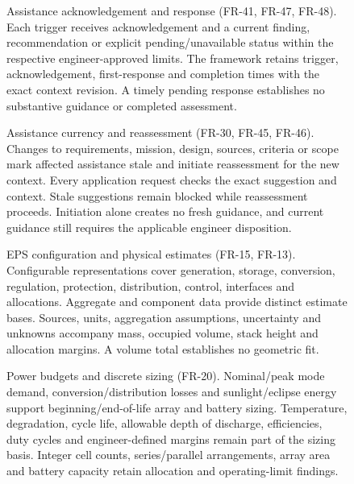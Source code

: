 \begin{figure}[H]
\centering
{}
\caption[Assistance acknowledgement and response.]{Assistance acknowledgement and response (FR-41, FR-47, FR-48). Each trigger receives acknowledgement and a current finding, recommendation or explicit pending/unavailable status within the respective engineer-approved limits. The framework retains trigger, acknowledgement, first-response and completion times with the exact context revision. A timely pending response establishes no substantive guidance or completed assessment.}
\label{fig:fr-flow-05}
\end{figure}
\clearpage

\begin{figure}[H]
\centering
{}
\caption[Assistance currency and reassessment.]{Assistance currency and reassessment (FR-30, FR-45, FR-46). Changes to requirements, mission, design, sources, criteria or scope mark affected assistance stale and initiate reassessment for the new context. Every application request checks the exact suggestion and context. Stale suggestions remain blocked while reassessment proceeds. Initiation alone creates no fresh guidance, and current guidance still requires the applicable engineer disposition.}
\label{fig:fr-flow-06}
\end{figure}
\clearpage

\begin{figure}[H]
\centering
{}
\caption[EPS configuration and physical estimates.]{EPS configuration and physical estimates (FR-15, FR-13). Configurable representations cover generation, storage, conversion, regulation, protection, distribution, control, interfaces and allocations. Aggregate and component data provide distinct estimate bases. Sources, units, aggregation assumptions, uncertainty and unknowns accompany mass, occupied volume, stack height and allocation margins. A volume total establishes no geometric fit.}
\label{fig:fr-flow-07}
\end{figure}
\clearpage

\begin{figure}[H]
\centering
{}
\caption[Power budgets and discrete sizing.]{Power budgets and discrete sizing (FR-20). Nominal/peak mode demand, conversion/distribution losses and sunlight/eclipse energy support beginning/end-of-life array and battery sizing. Temperature, degradation, cycle life, allowable depth of discharge, efficiencies, duty cycles and engineer-defined margins remain part of the sizing basis. Integer cell counts, series/parallel arrangements, array area and battery capacity retain allocation and operating-limit findings.}
\label{fig:fr-flow-08}
\end{figure}
\clearpage

